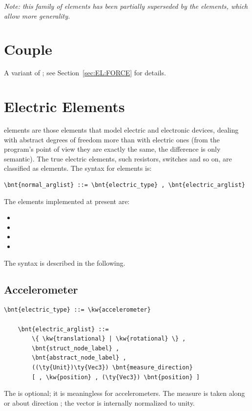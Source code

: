 {\em Note: this family of elements has been partially superseded by the
 elements, which allow more generality.}




\section{Couple}
A variant of ; see Section~\ref{sec:EL:FORCE} for details.




\section{Electric Elements}
 elements are those elements that model electric and electronic
devices, dealing with abstract degrees of freedom more than with electric
ones (from the program's point of view they are exactly the same, the
difference is only semantic). The true electric elements, such resistors,
switches and so on, are classified as  elements.
The syntax for  elements is:
\begin{Verbatim}[commandchars=\\\{\}]
    \bnt{normal_arglist} ::= \bnt{electric_type} , \bnt{electric_arglist}
\end{Verbatim}
The  elements implemented at present are:
\begin{itemize}
	\item {}
	\item {}
	\item {}
	\item {}
\end{itemize}
The syntax is described in the following.

\subsection{Accelerometer}
\begin{Verbatim}[commandchars=\\\{\}]
    \bnt{electric_type} ::= \kw{accelerometer}

    \bnt{electric_arglist} ::=
        \{ \kw{translational} | \kw{rotational} \} ,
        \bnt{struct_node_label} ,
        \bnt{abstract_node_label} ,
        ((\ty{Unit})\ty{Vec3}) \bnt{measure_direction}
        [ , \kw{position} , (\ty{Vec3}) \bnt{position} ]
\end{Verbatim}
The  is optional; it is meaningless for 
accelerometers.
The measure is taken along or about direction ;
the vector is internally normalized to unity.

